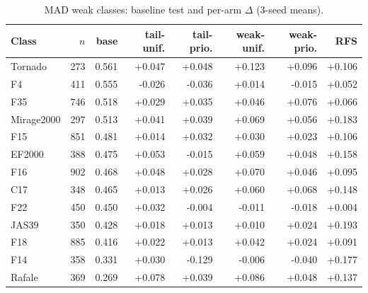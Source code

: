 \begin{table}[h]\centering\small\caption{MAD weak classes: baseline test \mapm{} and per-arm $\Delta$ (3-seed means).}\label{tab:pc-mad-weak}
\begin{tabular}{lrrrrrrr}\toprule
Class & $n$ & base & tail-unif. & tail-prio. & weak-unif. & weak-prio. & RFS \\ \midrule
Tornado & 273 & 0.561 & +0.047 & +0.048 & +0.123 & +0.096 & +0.106 \\
F4 & 411 & 0.555 & -0.026 & -0.036 & +0.014 & -0.015 & +0.052 \\
F35 & 746 & 0.518 & +0.029 & +0.035 & +0.046 & +0.076 & +0.066 \\
Mirage2000 & 297 & 0.513 & +0.041 & +0.039 & +0.069 & +0.056 & +0.183 \\
F15 & 851 & 0.481 & +0.014 & +0.032 & +0.030 & +0.023 & +0.106 \\
EF2000 & 388 & 0.475 & +0.053 & -0.015 & +0.059 & +0.048 & +0.158 \\
F16 & 902 & 0.468 & +0.048 & +0.028 & +0.070 & +0.046 & +0.095 \\
C17 & 348 & 0.465 & +0.013 & +0.026 & +0.060 & +0.068 & +0.148 \\
F22 & 450 & 0.450 & +0.032 & -0.004 & -0.011 & -0.018 & +0.004 \\
JAS39 & 350 & 0.428 & +0.018 & +0.013 & +0.010 & +0.024 & +0.193 \\
F18 & 885 & 0.416 & +0.022 & +0.013 & +0.042 & +0.024 & +0.091 \\
F14 & 358 & 0.331 & +0.030 & -0.129 & -0.006 & -0.040 & +0.177 \\
Rafale & 369 & 0.269 & +0.078 & +0.039 & +0.086 & +0.048 & +0.137 \\
\bottomrule\end{tabular}\end{table}
